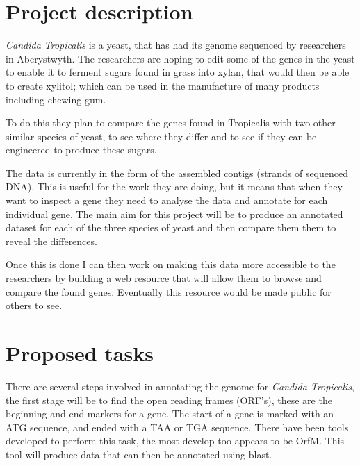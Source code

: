 \documentclass[11pt,fleqn,twoside]{article}
\begin{document}
\wordcount{}

\mmp

\setcounter{tocdepth}{3} %


\section{Project description}
\textit{Candida Tropicalis} is a yeast, that has had its genome sequenced by researchers in Aberystwyth. The researchers are hoping to edit some of the genes in the yeast to enable it to ferment sugars found in grass into xylan, that would then be able to create xylitol; which can be used in the manufacture of many products including chewing gum. 

To do this they plan to compare the genes found in Tropicalis with two other similar species of yeast, to see where they differ and to see if they can be engineered to produce these sugars. 

The data is currently in the form of the assembled contigs (strands of sequenced DNA). This is useful for the work they are doing, but it means that when they want to inspect a gene they need to analyse the data and annotate for each individual gene. The main aim for this project will be to produce an annotated dataset for each of the three species of yeast and then compare them them to reveal the differences. 

Once this is done I can then work on making this data more accessible to the researchers by building a web resource that will allow them to browse and compare the found genes. Eventually this resource would be made public for others to see. 


\section{Proposed tasks}
There are several steps involved in annotating the genome for \textit{Candida Tropicalis}, the first stage will be to find the open reading frames (ORF's), these are the beginning and end markers for a gene. The start of a gene is marked with an ATG sequence, and ended with a TAA or TGA sequence. There have been tools developed to perform this task, the most develop too appears to be OrfM\cite{OrfM}. This tool will produce data that can then be annotated using blast. 
\end{document}

